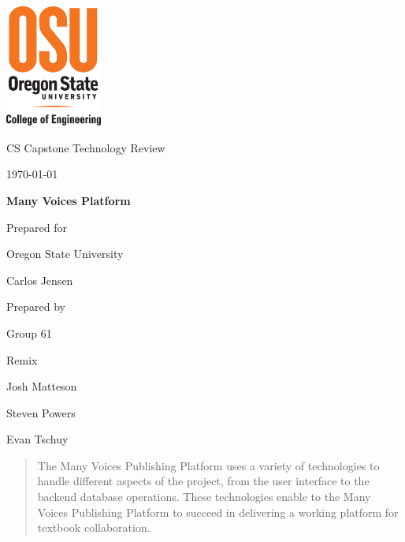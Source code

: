 \documentclass[onecolumn, draftclsnofoot,10pt, compsoc]{IEEEtran}
\def \CapstoneTeamName{		Remix}
\def \CapstoneTeamNumber{		61}
\def \GroupMemberOne{			Josh Matteson}
\def \GroupMemberTwo{			Steven Powers}
\def \GroupMemberThree{			Evan Tschuy}
\def \CapstoneProjectName{		Many Voices Platform}
\def \CapstoneSponsorCompany{	Oregon State University}
\def \CapstoneSponsorPerson{		Carlos Jensen}
\def \DocType{
				Technology Review
				}
\newcommand{\NameSigPair}[1]{\par
\makebox[2.75in][r]{#1} \hfil 	\makebox[3.25in]{\makebox[2.25in]{\hrulefill} \hfill		\makebox[.75in]{\hrulefill}}
\par\vspace{-12pt} \textit{\tiny\noindent
\makebox[2.75in]{} \hfil		\makebox[3.25in]{\makebox[2.25in][r]{Signature} \hfill	\makebox[.75in][r]{Date}}}}
\renewcommand{\NameSigPair}[1]{#1}
\begin{document}
\begin{titlepage}
    \begin{singlespace}
    	\includegraphics[height=4cm]{coe_v_spot1}
        \hfill
        \par\vspace{.2in}
        \centering
        \scshape{
            \huge CS Capstone \DocType \par
            {\large\today}\par
            \vspace{.5in}
            \textbf{\Huge\CapstoneProjectName}\par
            \vfill
            {\large Prepared for}\par
            \Huge \CapstoneSponsorCompany\par
            \vspace{5pt}
            {\Large\NameSigPair{\CapstoneSponsorPerson}\par}
            {\large Prepared by }\par
            Group\CapstoneTeamNumber\par
            \CapstoneTeamName\par
            \vspace{5pt}
            {\Large
                \NameSigPair{\GroupMemberOne}\par
                \NameSigPair{\GroupMemberTwo}\par
                \NameSigPair{\GroupMemberThree}\par
            }
            \vspace{20pt}
        }
        \begin{abstract}
		\noindent The Many Voices Publishing Platform uses a variety of technologies to handle different
		aspects of the project, from the user interface to the backend database operations. These
		technologies enable to the Many Voices Publishing Platform to succeed in delivering a working
		platform for textbook collaboration.
        \end{abstract}
    \end{singlespace}
\end{titlepage}
\newpage
{}
\tableofcontents
\clearpage
\end{document}
